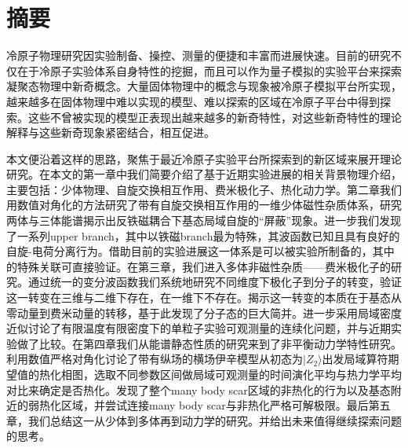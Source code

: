 \maketitle%
\MAKETITLE%
\makedeclaration%
\intobmk\chapter*{摘\quad 要}%
\setcounter{page}{1}%

冷原子物理研究因实验制备、操控、测量的便捷和丰富而进展快速。目前的研究不仅在于冷原子实验体系自身特性的挖掘，而且可以作为量子模拟的实验平台来探索凝聚态物理中新奇概念。大量固体物理中的概念与现象被冷原子模拟平台所实现，越来越多在固体物理中难以实现的模型、难以探索的区域在冷原子平台中得到探索。这些不曾被实现的模型正表现出越来越多的新奇特性，对这些新奇特性的理论解释与这些新奇现象紧密结合，相互促进。

本文便沿着这样的思路，聚焦于最近冷原子实验平台所探索到的新区域来展开理论研究。在本文的第一章中我们简要介绍了基于近期实验进展的相关背景物理介绍，主要包括：少体物理、自旋交换相互作用、费米极化子、热化动力学。第二章我们用数值对角化的方法研究了带有自旋交换相互作用的一维少体磁性杂质体系，研究两体与三体能谱揭示出反铁磁耦合下基态局域自旋的“屏蔽”现象。进一步我们发现了一系列upper branch，其中以铁磁branch最为特殊，其波函数已知且具有良好的自旋-电荷分离行为。借助目前的实验进展这一体系是可以被实验所制备的，其中的特殊关联可直接验证。在第三章，我们进入多体非磁性杂质——费米极化子的研究。通过统一的变分波函数我们系统地研究不同维度下极化子到分子的转变，验证这一转变在三维与二维下存在，在一维下不存在。揭示这一转变的本质在于基态从零动量到费米动量的转移，基于此发现了分子态的巨大简并。进一步采用局域密度近似讨论了有限温度有限密度下的单粒子实验可观测量的连续化问题，并与近期实验做了比较。在第四章我们从能谱静态性质的研究来到了非平衡动力学特性研究。利用数值严格对角化讨论了带有纵场的横场伊辛模型从初态为$|Z_2\rangle$出发局域算符期望值的热化相图，选取不同参数区间做局域可观测量的时间演化平均与热力学平均对比来确定是否热化。发现了整个many body scar区域的非热化的行为以及基态附近的弱热化区域，并尝试连接many body scar与非热化严格可解极限。最后第五章，我们总结这一从少体到多体再到动力学的研究。并给出未来值得继续探索问题的思考。




